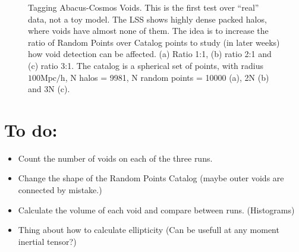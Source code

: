 \documentclass[preprint]{aastex62}
\begin{document}
\begin{figure}
  \caption{Tagging Abacus-Cosmos Voids. This is the first test over ``real''
    data, not a toy model. The LSS shows highly dense packed halos, where
    voids have almost none of them. The idea is to increase the ratio of
    Random Points over Catalog points to study (in later weeks) how void
    detection can be affected. (a) Ratio 1:1, (b) ratio 2:1 and (c) ratio 3:1.
    The catalog is a spherical set of points, with radius $100 \mathrm{Mpc/h}$,
    N halos = 9981, N random points = 10000 (a), 2N (b) and 3N (c).
    \label{Tagging voids}}
\end{figure}


\section{To do:}

\begin{itemize}
\item Count the number of voids on each of the three runs.
\item Change the shape of the Random Points Catalog (maybe outer voids are
  connected by mistake.)
\item Calculate the volume of each void and compare between runs. (Histograms)
\item Thing about how to calculate ellipticity
  (Can be usefull at any moment inertial tensor?)
\end{itemize} 







                       

\end{document}
